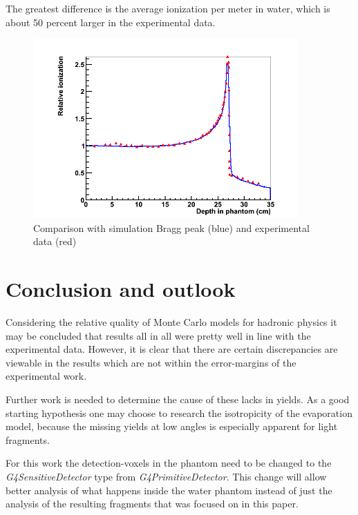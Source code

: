 The greatest difference is the average ionization per meter in water, which is about 50 percent larger in the experimental data. %


\begin{figure}[h] 
\begin{center}
\includegraphics[width=0.9\textwidth]{images/plots/braggPeak/braggPeakComparisonToData.png}  
\caption{\label{fig:braggPeakCompared} Comparison with simulation Bragg peak (blue) and experimental data (red)}
 \end{center}
 \end{figure}

\clearpage
\section{Conclusion and outlook}
Considering the relative quality of Monte Carlo models for hadronic physics it may be concluded that results all in all were pretty well in line with the experimental data. However, it is clear that there are certain discrepancies are viewable in the results which are not within the error-margins of the experimental work.

Further work is needed to determine the cause of these lacks in yields. As a good starting hypothesis one may choose to research the isotropicity of the evaporation model, because the missing yields at low angles is especially apparent for light fragments.

For this work the detection-voxels in the phantom need to be changed to the \textit{G4SensitiveDetector} type from \textit{G4PrimitiveDetector}. This change will allow better analysis of what happens inside the water phantom instead of just the analysis of the resulting fragments that was focused on in this paper.

